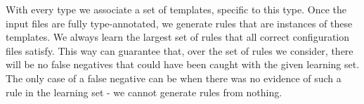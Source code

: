 With every type we associate a set of templates, specific to this type. Once the input files are fully type-annotated, we generate rules that are instances of these templates. We always learn the largest set of rules that all correct configuration files satisfy. This way \app can guarantee that, over the set of rules we consider, there will be no false negatives that could have been caught with the given learning set. The only case of a false negative can be when there was no evidence of such a rule in the learning set - we cannot generate rules from nothing. 
